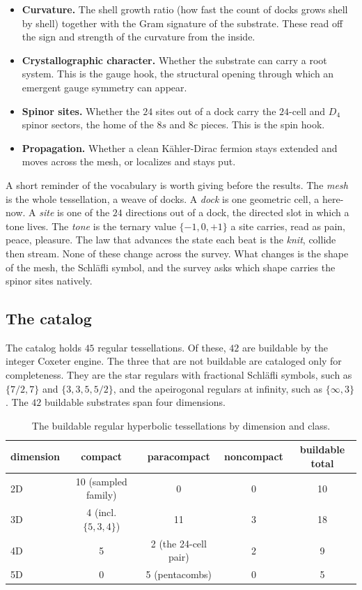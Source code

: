 \begin{itemize}
\item \textbf{Curvature.} The shell growth ratio (how fast the count of docks grows shell by shell) together with the Gram signature of the substrate. These read off the sign and strength of the curvature from the inside.
\item \textbf{Crystallographic character.} Whether the substrate can carry a root system. This is the gauge hook, the structural opening through which an emergent gauge symmetry can appear.
\item \textbf{Spinor sites.} Whether the $24$ sites out of a dock carry the $24$-cell and $D_4$ spinor sectors, the home of the $8s$ and $8c$ pieces. This is the spin hook.
\item \textbf{Propagation.} Whether a clean K\"ahler-Dirac fermion stays extended and moves across the mesh, or localizes and stays put.
\end{itemize}

A short reminder of the vocabulary is worth giving before the results. The \emph{mesh} is the whole tessellation, a weave of docks. A \emph{dock} is one geometric cell, a here-now. A \emph{site} is one of the $24$ directions out of a dock, the directed slot in which a tone lives. The \emph{tone} is the ternary value $\{-1, 0, +1\}$ a site carries, read as pain, peace, pleasure. The law that advances the state each beat is the \emph{knit}, collide then stream. None of these change across the survey. What changes is the shape of the mesh, the Schl\"afli symbol, and the survey asks which shape carries the spinor sites natively.

\subsection{The catalog}

The catalog holds $45$ regular tessellations. Of these, $42$ are buildable by the integer Coxeter engine. The three that are not buildable are cataloged only for completeness. They are the star regulars with fractional Schl\"afli symbols, such as $\{7/2, 7\}$ and $\{3, 3, 5, 5/2\}$, and the apeirogonal regulars at infinity, such as $\{\infty, 3\}$. The $42$ buildable substrates span four dimensions.

\begin{table}[ht]
\centering
\begin{tabular}{@{}lcccc@{}}
\toprule
dimension & compact & paracompact & noncompact & buildable total \\
\midrule
2D & 10 (sampled family) & 0 & 0 & 10 \\
3D & 4 (incl. $\{5,3,4\}$) & 11 & 3 & 18 \\
4D & 5 & 2 (the 24-cell pair) & 2 & 9 \\
5D & 0 & 5 (pentacombs) & 0 & 5 \\
\bottomrule
\end{tabular}
\caption{The buildable regular hyperbolic tessellations by dimension and class.}
\label{tab:tessellation-catalog}
\end{table}

